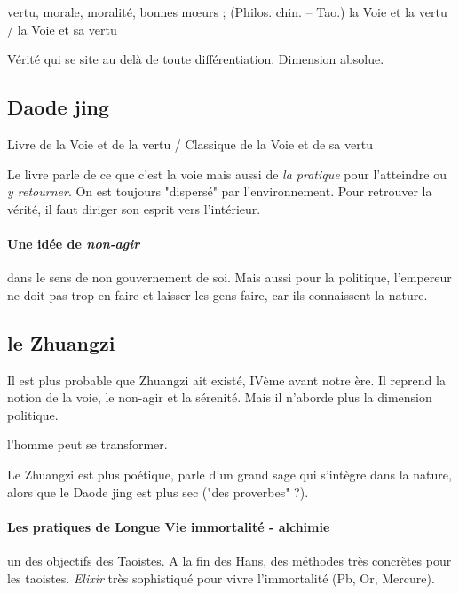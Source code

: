 \begin{Def}[daode 道德]
    vertu, morale, moralité, bonnes mœurs ; (Philos. chin. – Tao.) la Voie et la vertu / la Voie et sa vertu
\end{Def}
Vérité qui se site au delà de toute différentiation.  Dimension absolue. 


\subsection{Daode jing}
\begin{Def}
    Livre de la Voie et de la vertu / Classique de la Voie et de sa vertu  
\end{Def}

Le livre parle de ce que c'est la voie mais aussi de \textit{la pratique} pour l'atteindre ou \textit{y retourner}. On est toujours "dispersé" par l'environnement. Pour retrouver la vérité, il faut diriger son esprit vers l'intérieur.

\paragraph{Une idée de \textit{non-agir}}

dans le sens de non gouvernement de soi. Mais aussi pour la politique, l'empereur ne doit pas trop en faire et laisser les gens faire, car ils connaissent la nature.

\subsection{le Zhuangzi}

Il est plus probable que Zhuangzi ait existé, IVème avant notre ère. Il reprend la notion de la voie, le non-agir et la sérenité. Mais il n'aborde plus la dimension politique.

l'homme peut se transformer.

Le Zhuangzi est plus poétique, parle d'un grand sage qui s'intègre dans la nature, alors que le Daode jing est plus sec ("des proverbes" ?).

\paragraph{Les pratiques de Longue Vie immortalité - alchimie} un des objectifs des Taoistes. A la fin des Hans, des méthodes très concrètes pour les taoistes. \textit{Elixir} très sophistiqué pour vivre l'immortalité (Pb, Or, Mercure). 

